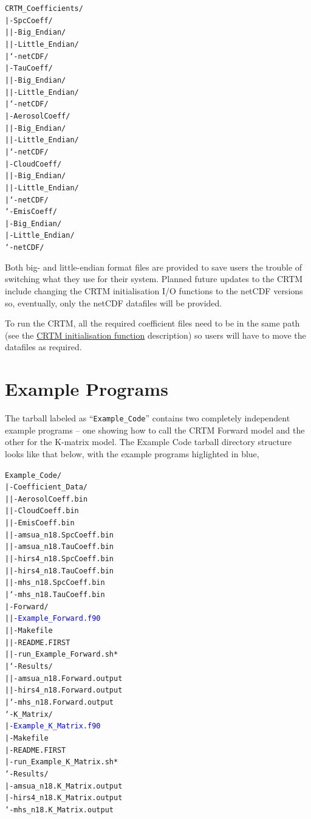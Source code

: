 \begin{alltt}
    CRTM_Coefficients/
     |- SpcCoeff/
     |   |- Big_Endian/
     |   |- Little_Endian/
     |   `- netCDF/
     |- TauCoeff/
     |   |- Big_Endian/
     |   |- Little_Endian/
     |   `- netCDF/
     |- AerosolCoeff/
     |   |- Big_Endian/
     |   |- Little_Endian/
     |   `- netCDF/
     |- CloudCoeff/
     |   |- Big_Endian/
     |   |- Little_Endian/
     |   `- netCDF/
     `- EmisCoeff/
         |- Big_Endian/
         |- Little_Endian/
         `- netCDF/
\end{alltt}
Both big- and little-endian format files are provided to save users the trouble of switching what they use for their system. Planned future updates to the CRTM include changing the CRTM initialisation I/O functions to the netCDF versions so, eventually, only the netCDF datafiles will be provided.

To run the CRTM, all the required coefficient files need to be in the same path (see the  \hyperref[sec:CRTM_Init_interface]{CRTM initialisation function} description) so users will have to move the datafiles as required.


\section{Example Programs}
The tarball labeled as ``\texttt{Example\_Code}'' contains two completely independent example programs -- one showing how to call the CRTM Forward model and the other for the K-matrix model. The Example Code tarball directory structure looks like that below, with the example programs higlighted in blue,

\begin{alltt}
    Example_Code/
     |- Coefficient_Data/
     |   |- AerosolCoeff.bin
     |   |- CloudCoeff.bin
     |   |- EmisCoeff.bin
     |   |- amsua_n18.SpcCoeff.bin
     |   |- amsua_n18.TauCoeff.bin
     |   |- hirs4_n18.SpcCoeff.bin
     |   |- hirs4_n18.TauCoeff.bin
     |   |- mhs_n18.SpcCoeff.bin
     |   `- mhs_n18.TauCoeff.bin
     |- Forward/
     |   |- \textcolor{blue}{Example_Forward.f90}
     |   |- Makefile
     |   |- README.FIRST
     |   |- run_Example_Forward.sh*
     |   `- Results/
     |       |- amsua_n18.Forward.output
     |       |- hirs4_n18.Forward.output
     |       `- mhs_n18.Forward.output
     `- K_Matrix/
         |- \textcolor{blue}{Example_K_Matrix.f90}
         |- Makefile
         |- README.FIRST
         |- run_Example_K_Matrix.sh*
         `- Results/
             |- amsua_n18.K_Matrix.output
             |- hirs4_n18.K_Matrix.output
             `- mhs_n18.K_Matrix.output
\end{alltt}

